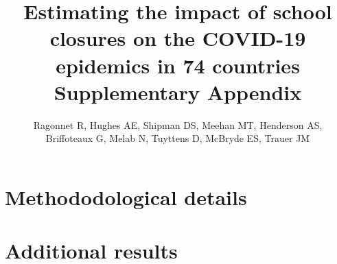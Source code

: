 \documentclass[10pt,a4paper]{report}
\author{
    Ragonnet R, Hughes AE, Shipman DS, Meehan MT, Henderson AS,\\Briffoteaux G, Melab N, Tuyttens D, McBryde ES, Trauer JM
}
\title{
    Estimating the impact of school closures on the COVID-19 epidemics in 74 countries\\
    \Large Supplementary Appendix
}
\date{\vspace{-5ex}} %
\begin{document}
\maketitle
\tableofcontents
\newpage
\chapter{Methododological details}




\newpage
\printbibliography


\chapter{Additional results}

\end{document}

